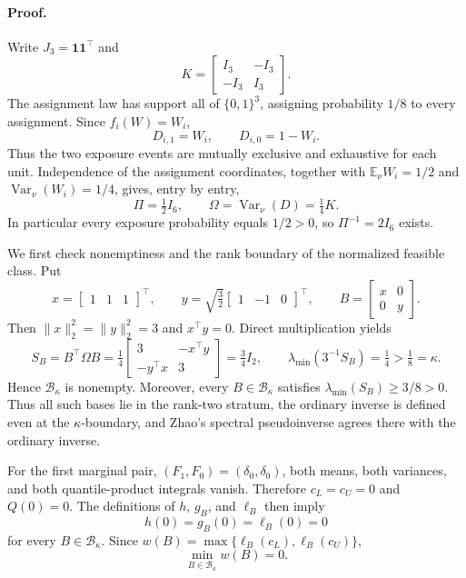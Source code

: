 \paragraph{Proof.}
Write \(J_3=\mathbf 1\mathbf 1^{\top}\) and
\[
K=\begin{bmatrix}I_3&-I_3\\-I_3&I_3\end{bmatrix}.
\]
The assignment law has support all of \(\{0,1\}^3\), assigning probability \(1/8\) to every assignment.  Since \(f_i(W)=W_i\),
\[
D_{i,1}=W_i,\qquad D_{i,0}=1-W_i.
\]
Thus the two exposure events are mutually exclusive and exhaustive for each unit.  Independence of the assignment coordinates, together with \(\mathbb E_\nu W_i=1/2\) and \(\operatorname{Var}_\nu(W_i)=1/4\), gives, entry by entry,
\[
\Pi=\tfrac12 I_6,
\qquad
\Omega=\operatorname{Var}_\nu(D)=\tfrac14K.
\]
In particular every exposure probability equals \(1/2>0\), so \(\Pi^{-1}=2I_6\) exists.

We first check nonemptiness and the rank boundary of the normalized feasible class.  Put
\[
x=\begin{bmatrix}1&1&1\end{bmatrix}^{\top},
\qquad
y=\sqrt{\tfrac32}\begin{bmatrix}1&-1&0\end{bmatrix}^{\top},
\qquad
B=\begin{bmatrix}x&0\\0&y\end{bmatrix}.
\]
Then \(\lVert x\rVert_2^2=\lVert y\rVert_2^2=3\) and \(x^{\top}y=0\).  Direct multiplication yields
\[
S_B=B^{\top}\Omega B
=\tfrac14\begin{bmatrix}3&-x^{\top}y\\-y^{\top}x&3\end{bmatrix}
=\tfrac34I_2,
\qquad
\lambda_{\min}(3^{-1}S_B)=\tfrac14>\tfrac18=\kappa.
\]
Hence \(\mathcal B_\kappa\) is nonempty.  Moreover, every \(B\in\mathcal B_\kappa\) satisfies \(\lambda_{\min}(S_B)\ge 3/8>0\).  Thus all such bases lie in the rank-two stratum, the ordinary inverse is defined even at the \(\kappa\)-boundary, and Zhao's spectral pseudoinverse agrees there with the ordinary inverse.

For the first marginal pair, \((F_1,F_0)=(\delta_0,\delta_0)\), both means, both variances, and both quantile-product integrals vanish.  Therefore \(c_L=c_U=0\) and \(Q(0)=0\).  The definitions of \(h\), \(g_B\), and \(\ell_B\) then imply
\[
h(0)=g_B(0)=\ell_B(0)=0
\]
for every \(B\in\mathcal B_\kappa\).  Since \(w(B)=\max\{\ell_B(c_L),\ell_B(c_U)\}\),
\[
\min_{B\in\mathcal B_\kappa}w(B)=0.
\]

